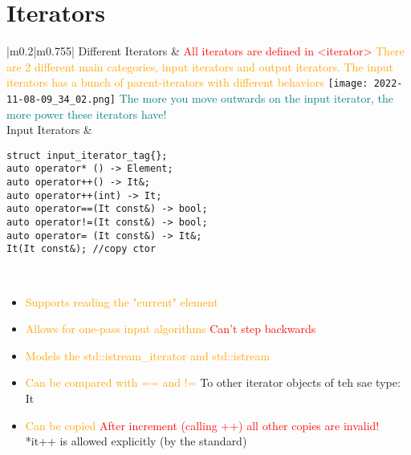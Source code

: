 \documentclass[main.tex,fontsize=8pt,paper=a4,paper=portrait,DIV=calc,]{scrartcl}
\begin{document}
\begin{table}[ht!]
\section{Iterators}
\begin{tabular}{|m{0.2\linewidth}|m{0.755\linewidth}|}
\hline
Different Iterators & 
\textcolor{red}{All iterators are defined in <iterator>}\newline
\textcolor{orange}{There are 2 different main categories, input iterators and output iterators.\newline
The input iterators has a bunch of parent-iterators with different behaviors}\newline
\texttt{[image: 2022-11-08-09\_34\_02.png]}\newline
\textcolor{teal}{The more you move outwards on the input iterator, the more power these iterators have!}\\
\hline
Input Iterators & 
\begin{lstlisting}
struct input_iterator_tag{};
auto operator* () -> Element;
auto operator++() -> It&;
auto operator++(int) -> It;
auto operator==(It const&) -> bool;
auto operator!=(It const&) -> bool;
auto operator= (It const&) -> It&;
It(It const&); //copy ctor
\end{lstlisting} 
\, \newline
\begin{itemize}
\item \textcolor{orange}{Supports reading the "current" element}
\item \textcolor{orange}{Allows for one-pass input algorithms}\newline
  \textcolor{red}{Can't step backwards}
\item \textcolor{orange}{Models the std::istream\_iterator and std::istream}
\item \textcolor{orange}{Can be compared with == and !=}\newline
  To other iterator objects of teh sae type: It
\item \textcolor{orange}{Can be copied}\newline
  \textcolor{red}{After increment (calling ++) all other copies are invalid!}\newline
  *it++ is allowed explicitly (by the standard)
\vspace{-2mm}
\end{itemize}\\
\hline
\end{tabular}
\end{table}
\pagebreak
\end{document}
